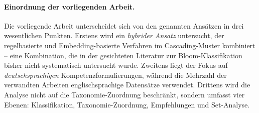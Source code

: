 \paragraph{Einordnung der vorliegenden Arbeit.}

Die vorliegende Arbeit unterscheidet sich von den genannten Ansätzen in drei wesentlichen Punkten.
Erstens wird ein \emph{hybrider Ansatz} untersucht, der regelbasierte und Embedding-basierte Verfahren im Cascading-Muster kombiniert -- eine Kombination, die in der gesichteten Literatur zur Bloom-Klassifikation bisher nicht systematisch untersucht wurde.
Zweitens liegt der Fokus auf \emph{deutschsprachigen} Kompetenzformulierungen, während die Mehrzahl der verwandten Arbeiten englischsprachige Datensätze verwendet.
Drittens wird die Analyse nicht auf die Taxonomie-Zuordnung beschränkt, sondern umfasst vier Ebenen: Klassifikation, Taxonomie-Zuordnung, Empfehlungen und Set-Analyse.
